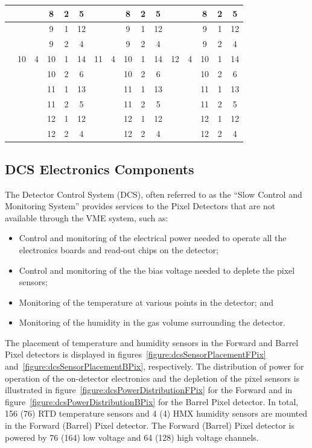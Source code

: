 \documentclass{cmspaper}
\begin{document}
\begin{table}[htb]
\begin{center}
\begin{tabular}{l|l|cccc|l|cccc|l|cccc}
    &   &   & 8 & 2 &  5 &    &   & 8 & 2&  5 &   &   & 8 & 2&  5 \\ \hline
    &   &   & 9 & 1 & 12 &    &   & 9 & 1& 12 &   &   & 9 & 1& 12 \\ \hline
    &   &   & 9 & 2 &  4 &    &   & 9 & 2&  4 &   &   & 9 & 2&  4 \\ \hline
    & 10& 4 & 10 & 1 & 14 & 11& 4 & 10& 1& 14 & 12& 4 & 10 & 1& 14 \\ \hline
    &   &   & 10 & 2 &  6 &    &  & 10& 2&  6 &   &   & 10 & 2&  6 \\ \hline
    &   &   & 11 & 1 & 13 &    &  & 11& 1& 13 &   &   & 11 & 1& 13 \\ \hline
    &   &   & 11 & 2 &  5 &    &  & 11& 2&  5 &   &   & 11 & 2&  5 \\ \hline
    &   &   & 12 & 1 & 12 &    &  & 12& 1& 12 &   &   & 12 & 1& 12 \\ \hline
    &   &   & 12 & 2 &  4 &    &  & 12& 2&  4 &   &   & 12 & 2&  4 \\ \hline
      \end{tabular}
    \end{center}
  \end{table}


\subsection{DCS Electronics Components}

The Detector Control System (DCS), often referred to as 
the ``Slow Control and Monitoring System''
provides services to the Pixel Detectors that are not available through the
VME system, such as:
\begin{itemize}
\item Control and monitoring of the electrical power needed to operate all
 the electronics boards and read-out chips on the detector;
\item Control and monitoring of the the bias voltage needed to deplete the
pixel sensors;
\item Monitoring of the temperature at various points in the detector; and
\item Monitoring of the humidity in the gas volume surrounding the detector.
\end{itemize}

The placement of temperature and humidity sensors in the Forward and Barrel Pixel detectors is displayed in 
figures~\ref{figure:dcsSensorPlacementFPix} and~\ref{figure:dcsSensorPlacementBPix}, respectively.
The distribution of power for operation of the on-detector electronics and the depletion of the pixel sensors 
is illustrated in figure~\ref{figure:dcsPowerDistributionFPix} for the Forward and in figure~\ref{figure:dcsPowerDistributionBPix}
for the Barrel Pixel detector.
In total, 156 (76) RTD temperature sensors and 4 (4) HMX humidity sensors are mounted in the Forward (Barrel) Pixel detector.
The Forward (Barrel) Pixel detector is powered by 76 (164) low voltage and 64 (128) high voltage channels.
\end{document}
